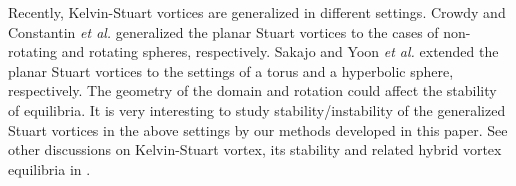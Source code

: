 \documentclass[1 [leqno, 11pt]{amsart}
\numberwithin{equation}{section}
\begin{document}
\begin{CJK*}{GBK}{song}
Recently,   Kelvin-Stuart vortices are generalized  in different settings.
 Crowdy \cite{Crowdy04} and Constantin {\it et al.} \cite{Constantin-Crowdy-Krishnamurthy-Wheeler2021}  generalized
the planar Stuart vortices to the cases of  non-rotating and rotating
spheres, respectively.
Sakajo \cite{Sakajo2019} and Yoon {\it et al.}  \cite{Yoon20} extended the planar Stuart vortices to the settings
of  a torus and  a
hyperbolic sphere, respectively. The geometry of the domain and rotation could affect the stability of equilibria. It is very interesting to study  stability/instability of the generalized Stuart vortices in the above settings by  our methods developed in this paper.
See other discussions on Kelvin-Stuart vortex, its stability and related hybrid vortex
equilibria in \cite{Klaassen-Peltier1991, Dauxois-Fauve-Tuckerman1996, BD01, Majda-Bertozzi02, Constantin-Krishnamurthy2019, Krishnamurthy2019, Krishnamurthy2021}.



\end{CJK*}
\end{document}
